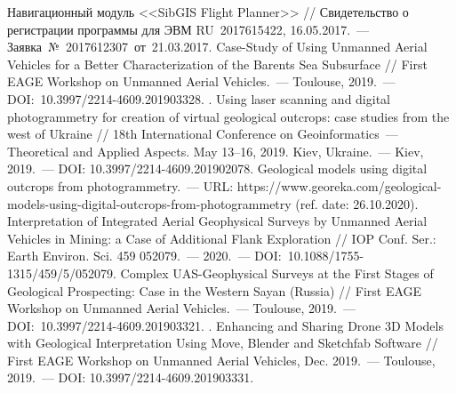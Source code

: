 \begin{thebibliography}{99}

\bibitem{} Навигационный модуль <<SibGIS Flight Planner>> // Свидетельство о регистрации программы для ЭВМ RU~2017615422, 16.05.2017.~--- Заявка №~2017612307 от 21.03.2017.
\bibitem{} Case-Study of Using Unmanned Aerial Vehicles for a Better Characterization of the Barents Sea Subsurface // First EAGE Workshop on Unmanned Aerial Vehicles.~--- Toulouse, 2019.~--- DOI:~10.3997/2214-4609.201903328.
\bibitem{}. Using laser scanning and digital photogrammetry for creation of virtual geological outcrops: case studies from the west of Ukraine // 18th International Conference on Geoinformatics~--- Theoretical and Applied Aspects. May 13--16, 2019. Kiev, Ukraine.~--- Kiev, 2019.~--- DOI: 10.3997/2214-4609.201902078.
\bibitem{}Geological models using digital outcrops from photogrammetry.~--- URL: https://www.georeka.com/geological\--models\--using\--digital\--outcrops\--from\--photogrammetry (ref. date: 26.10.2020).
\bibitem{} Interpretation of Integrated Aerial Geophysical Surveys by Unmanned Aerial Vehicles in Mining: a Case of Additional Flank Exploration // IOP Conf. Ser.: Earth Environ. Sci. 459 052079.~--- 2020.~--- DOI:~10.1088/1755-1315/459/5/052079.
\bibitem{} Complex UAS-Geophysical Surveys at the First Stages of Geological Prospecting: Case in the Western Sayan (Russia) // First EAGE Workshop on Unmanned Aerial Vehicles.~--- Toulouse, 2019.~--- DOI:~10.3997/2214-4609.201903321.
\bibitem{}. Enhancing and Sharing Drone 3D Models with Geological Interpretation Using Move, Blender and Sketchfab Software // First EAGE Workshop on Unmanned Aerial Vehicles, Dec. 2019.~--- Toulouse, 2019.~--- DOI: 10.3997/2214-4609.201903331.
\end{thebibliography}
